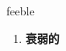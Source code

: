 
\begin{frame}
{\huge feeble}
\begin{center}
\begin{enumerate}\Large
  \item \textbf{衰弱的}
\end{enumerate}
\end{center}
\end{frame}
